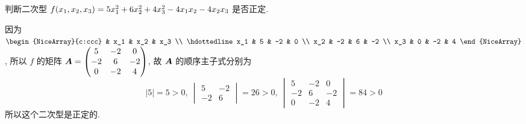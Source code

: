 \begin{example}
    判断二次型 $f\qty(x_1,x_2,x_3)=5x_1^2+6x_2^2+4x_3^2-4x_1x_2-4x_2x_3$ 是否正定.
\end{example}
\begin{solution}
    因为 $\begin{NiceArray}{c:ccc}
                & x_1 & x_2 & x_3 \\ \hdottedline
            x_1 & 5   & -2  & 0   \\
            x_2 & -2  & 6   & -2  \\
            x_3 & 0   & -2  & 4
        \end{NiceArray}$, 所以 $f$ 的矩阵 $\vb*{A}=\begin{pmatrix}
            5  & -2 & 0  \\
            -2 & 6  & -2 \\
            0  & -2 & 4
        \end{pmatrix}$, 故 $\vb*{A}$ 的顺序主子式分别为
    $$|5|=5>0,~\begin{vmatrix}
            5  & -2 \\
            -2 & 6
        \end{vmatrix}=26>0,~\begin{vmatrix}
            5  & -2 & 0  \\
            -2 & 6  & -2 \\
            0  & -2 & 4
        \end{vmatrix}=84>0$$
    所以这个二次型是正定的.
\end{solution}

